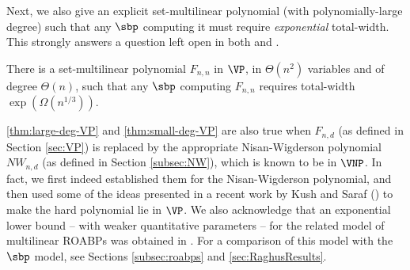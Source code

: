 \documentclass{article}
\begin{document}
Next, we also give an explicit set-multilinear polynomial (with polynomially-large degree) such that any $\sbp$ computing it must require \emph{exponential} total-width. 
This strongly answers a question left open in both \cite{ArvindR16} and \cite{BDS23}. 


\begin{theorem}\label{thm:large-deg-VP}
There is a set-multilinear polynomial $F_{n,n}$ in $\VP$, in  $\Theta(n^2)$ variables and of degree $\Theta(n)$, such that any $\sbp$ computing $F_{n,n}$ requires total-width ${\exp(\Omega(n^{1/3}))}$.
\end{theorem}



\autoref{thm:large-deg-VP} and \autoref{thm:small-deg-VP} are also true when $F_{n,d}$ (as defined in Section \ref{sec:VP}) is replaced by the appropriate Nisan-Wigderson polynomial $NW_{n,d}$ (as defined in Section \ref{subsec:NW}), which is known to be in $\VNP$. In fact, we first indeed established them for the Nisan-Wigderson polynomial, and then used some of the ideas presented in a recent work by Kush and Saraf (\cite{KushS23}) to make the hard polynomial lie in $\VP$. {We also acknowledge that an exponential lower bound  -- with weaker quantitative parameters -- for the related model of multilinear ROABPs was obtained in \cite{RR20}. For a  comparison of this model with the $\sbp$ model, see Sections \ref{subsec:roabps} and \ref{sec:RaghusResults}.  %
}
\end{document}
